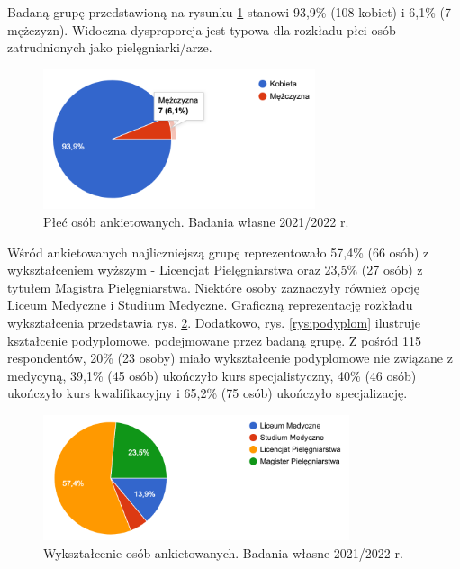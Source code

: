\documentclass[a4paper,12pt,twoside,openright]{mwrep}
\begin{document}
Badaną grupę przedstawioną  na rysunku \ref{rys:plec} stanowi  93,9\%  (108 kobiet) i  6,1\%  (7 mężczyzn). Widoczna dysproporcja jest typowa dla rozkładu płci osób zatrudnionych jako pielęgniarki/arze.

\begin{figure}[H]
\centering
\includegraphics[width=8cm]{char_gr_bad/plec00}
\caption{Płeć osób ankietowanych. Badania własne 2021/2022 r.}
\label{rys:plec}
\end{figure}




Wśród ankietowanych najliczniejszą grupę reprezentowało 57,4\% (66 osób) z wykształceniem wyższym - Licencjat Pielęgniarstwa oraz  23,5\%  (27 osób) z tytułem Magistra Pielęgniarstwa. Niektóre osoby zaznaczyły również opcję Liceum Medyczne i  Studium Medyczne. Graficzną reprezentację rozkładu wykształcenia przedstawia rys. \ref{rys:wykszt}. Dodatkowo, rys. \ref{rys:podyplom} ilustruje kształcenie podyplomowe, podejmowane przez badaną grupę. Z pośród 115 respondentów, 20\% (23 osoby) miało wykształcenie podyplomowe nie związane z medycyną, 39,1\% (45 osób) ukończyło kurs specjalistyczny, 40\% (46 osób) ukończyło kurs kwalifikacyjny i 
65,2\% (75 osób) ukończyło specjalizację.  


\begin{figure}[H]
\centering
\includegraphics[width=9cm]{char_gr_bad/wyksztalc00}
\caption{Wykształcenie osób ankietowanych. Badania własne 2021/2022 r.}
\label{rys:wykszt}
\end{figure}
\end{document}
